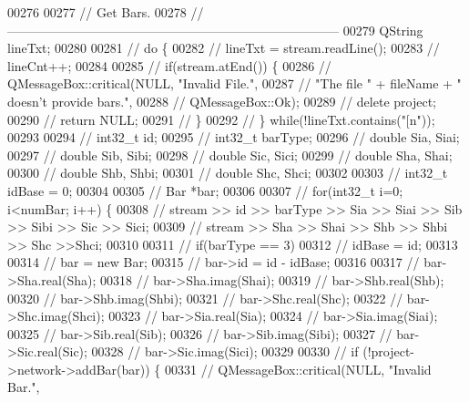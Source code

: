\begin{DoxyCode}
00276 
00277 \textcolor{comment}{// Get Bars.}
00278 \textcolor{comment}{//------------------------------------------------------------------------------}
00279   QString lineTxt;
00280 
00281 \textcolor{comment}{//  do \{}
00282 \textcolor{comment}{//    lineTxt = stream.readLine();}
00283 \textcolor{comment}{//    lineCnt++;}
00284 
00285 \textcolor{comment}{//    if(stream.atEnd()) \{}
00286 \textcolor{comment}{//      QMessageBox::critical(NULL, "Invalid File.",}
00287 \textcolor{comment}{//                            "The file " + fileName + " doesn't provide bars.",}
00288 \textcolor{comment}{//                            QMessageBox::Ok);}
00289 \textcolor{comment}{//      delete project;}
00290 \textcolor{comment}{//      return NULL;}
00291 \textcolor{comment}{//    \}}
00292 \textcolor{comment}{//  \} while(!lineTxt.contains("[n"));}
00293 
00294 \textcolor{comment}{//  int32\_t id;}
00295 \textcolor{comment}{//  int32\_t barType;}
00296 \textcolor{comment}{//  double Sia, Siai;}
00297 \textcolor{comment}{//  double Sib, Sibi;}
00298 \textcolor{comment}{//  double Sic, Sici;}
00299 \textcolor{comment}{//  double Sha, Shai;}
00300 \textcolor{comment}{//  double Shb, Shbi;}
00301 \textcolor{comment}{//  double Shc, Shci;}
00302 
00303 \textcolor{comment}{//  int32\_t idBase = 0;}
00304 
00305 \textcolor{comment}{//  Bar *bar;}
00306 
00307 \textcolor{comment}{//  for(int32\_t i=0; i<numBar; i++) \{}
00308 \textcolor{comment}{//    stream >> id >> barType >> Sia >> Siai >> Sib >> Sibi >> Sic >> Sici;}
00309 \textcolor{comment}{//    stream >> Sha >> Shai >> Shb >> Shbi >> Shc >>Shci;}
00310 
00311 \textcolor{comment}{//    if(barType == 3)}
00312 \textcolor{comment}{//      idBase = id;}
00313 
00314 \textcolor{comment}{//    bar = new Bar;}
00315 \textcolor{comment}{//    bar->id = id - idBase;}
00316 
00317 \textcolor{comment}{//    bar->Sha.real(Sha);}
00318 \textcolor{comment}{//    bar->Sha.imag(Shai);}
00319 \textcolor{comment}{//    bar->Shb.real(Shb);}
00320 \textcolor{comment}{//    bar->Shb.imag(Shbi);}
00321 \textcolor{comment}{//    bar->Shc.real(Shc);}
00322 \textcolor{comment}{//    bar->Shc.imag(Shci);}
00323 \textcolor{comment}{//    bar->Sia.real(Sia);}
00324 \textcolor{comment}{//    bar->Sia.imag(Siai);}
00325 \textcolor{comment}{//    bar->Sib.real(Sib);}
00326 \textcolor{comment}{//    bar->Sib.imag(Sibi);}
00327 \textcolor{comment}{//    bar->Sic.real(Sic);}
00328 \textcolor{comment}{//    bar->Sic.imag(Sici);}
00329 
00330 \textcolor{comment}{//    if (!project->network->addBar(bar)) \{}
00331 \textcolor{comment}{//      QMessageBox::critical(NULL, "Invalid Bar.",}

\end{DoxyCode}
